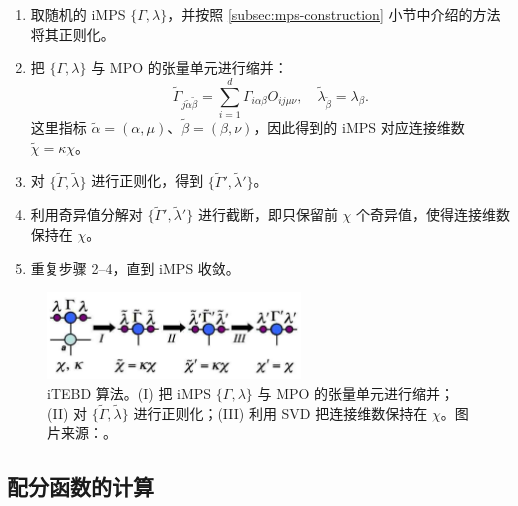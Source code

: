 \begin{enumerate}
  \item 取随机的 iMPS $\{\Gamma,\lambda\}$，并按照 \ref{subsec:mps-construction} 小节中介绍的方法将其正则化。

  \item 把 $\{\Gamma,\lambda\}$ 与 MPO 的张量单元进行缩并：
    \begin{equation}
      \tilde{\Gamma}_{j\tilde{\alpha}\tilde{\beta}} = \sum_{i=1}^d \Gamma_{i\alpha\beta} O_{ij\mu\nu}, \quad
      \tilde{\lambda}_{\tilde{\beta}} = \lambda_\beta.
    \end{equation}
    这里指标 $\tilde{\alpha}=(\alpha,\mu)$、$\tilde{\beta}=(\beta,\nu)$，因此得到的 iMPS 对应连接维数 $\tilde{\chi}=\kappa\chi$。

  \item 对 $\{\tilde{\Gamma},\tilde{\lambda}\}$ 进行正则化，得到 $\{\tilde{\Gamma}',\tilde{\lambda}'\}$。

  \item 利用奇异值分解对 $\{\tilde{\Gamma}',\tilde{\lambda}'\}$ 进行截断，即只保留前 $\chi$ 个奇异值，使得连接维数保持在 $\chi$。

  \item 重复步骤 2--4，直到 iMPS 收敛。
\end{enumerate}

\begin{figure}[htb]
  \centering
  \includegraphics[width=0.6\textwidth]{images/tensor-network/itebd-evolution.pdf}
  \caption[iTEBD 算法]{iTEBD 算法。(I) 把 iMPS $\{\Gamma,\lambda\}$ 与 MPO 的张量单元进行缩并；(II) 对 $\{\tilde{\Gamma},\tilde{\lambda}\}$ 进行正则化；(III) 利用 SVD 把连接维数保持在 $\chi$。图片来源：\parencite{orus2008infinite}。}
  \label{fig:itebd-evolution}
\end{figure}

\subsection{配分函数的计算}
\label{subsec:partition-function}

